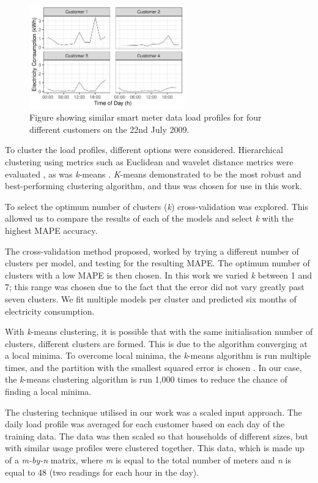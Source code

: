 \begin{figure}
	\centering
	\includegraphics[width=0.6\textwidth]{Chapter5/figures/short-term-forecasting/ebp_net-resizeimage-1.pdf}
	\caption{Figure showing similar smart meter data load profiles for four different customers on the 22nd July 2009.}
	\label{fig:similar_customers}
\end{figure}

To cluster the load profiles, different options were considered. Hierarchical clustering using metrics such as Euclidean and wavelet distance metrics were evaluated \cite{BIMJ:BIMJ4710240520}, as was \textit{k}-means \cite{forgy65}.\textit{ K}-means demonstrated to be the most robust and best-performing clustering algorithm, and thus was chosen for use in this work.

To select the optimum number of clusters (\textit{k}) cross-validation was explored. This allowed us to compare the results of each of the models and select \textit{k} with the highest MAPE accuracy.

The cross-validation method proposed, worked by trying a different number of clusters per model, and testing for the resulting MAPE. The optimum number of clusters with a low MAPE is then chosen. In this work we varied \textit{k} between 1 and 7; this range was chosen due to the fact that the error did not vary greatly past seven clusters. We fit multiple models per cluster and predicted six months of electricity consumption.

With \textit{k}-means clustering, it is possible that with the same initialisation number of clusters, different clusters are formed. This is due to the algorithm converging at a local minima. To overcome local minima, the \textit{k}-means algorithm is run multiple times, and the partition with the smallest squared error is chosen \cite{Jain2010}. In our case, the \textit{k}-means clustering algorithm is run 1,000 times to reduce the chance of finding a local minima. 

The clustering technique utilised in our work was a scaled input approach. The daily load profile was averaged for each customer based on each day of the training data. The data was then scaled so that households of different sizes, but with similar usage profiles were clustered together. This data, which is made up of a \textit{m-by-n} matrix, where \textit{m} is equal to the total number of meters and \textit{n} is equal to 48 (two readings for each hour in the day).

